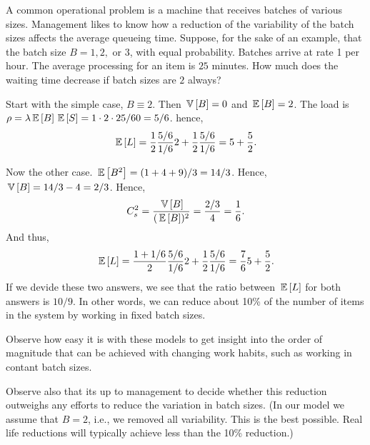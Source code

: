 \begin{question}
  A common operational problem is a machine that receives batches of
  various sizes. Management likes to know how a reduction of the
  variability of the batch sizes affects the average queueing time.
  Suppose, for the sake of an example, that the batch size $B=1,2,$ or
  $3$, with equal probability. Batches arrive at rate 1 per hour. The
  average processing for an item is $25$ minutes.  How much does the
  waiting time decrease if batch sizes are $2$ always?

  \begin{solution}
    Start with the simple case, $B\equiv 2$. Then $\,\mathbb{V}\left[B\right]=0$ and
    $\,\mathbb{E}\left[B\right] = 2$. The load is $\rho=\lambda \,\mathbb{E}\left[B\right] \,\mathbb{E}\left[S\right] = 1\cdot 2 \cdot 25/60 = 5/6$.  hence,
    \begin{equation*}
      \,\mathbb{E}\left[L\right] = \frac 12 \frac{5/6}{1/6} 2 + \frac 12 \frac{5/6}{1/6} = 5 + \frac52.
    \end{equation*}

Now the other case. $\,\mathbb{E}\left[B^2\right] = (1+4+9)/3 = 14/3$. Hence, $\,\mathbb{V}\left[B\right]=14/3 - 4=2/3$. Hence, 
\begin{equation*}
C_s^2=\frac{\,\mathbb{V}\left[B\right]}{(\,\mathbb{E}\left[B\right])^2} = \frac{2/3}4 = \frac 16.
\end{equation*}
And thus, 
    \begin{equation*}
      \,\mathbb{E}\left[L\right] = \frac {1+1/6}2 \frac{5/6}{1/6} 2 + \frac 12 \frac{5/6}{1/6} = \frac76 5 + \frac 52.
    \end{equation*}
    If we devide these two answers, we see that the ratio between
    $\,\mathbb{E}\left[L\right]$ for both answers is $10/9$. In other words, we can
    reduce about 10\% of the number of items in the system by working
    in fixed batch sizes. 

    Observe how easy it is with these models to get insight into the
    order of magnitude that can be achieved with changing work habits,
    such as working in contant batch sizes. 

    Observe also that its up to management to decide whether this
    reduction outweighs any efforts to reduce the variation in batch
    sizes. (In our model we assume that $B=2$, i.e., we removed all
    variability. This is the best possible. Real life reductions will
    typically achieve less than the 10\% reduction.)
  \end{solution}
\end{question}

